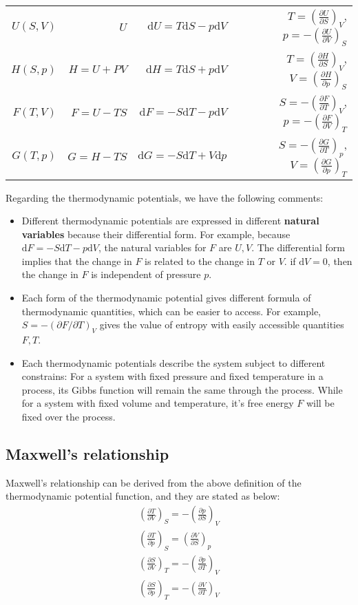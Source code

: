\documentclass{article}
\newcommand{\pfrac}[2]{\frac{\partial #1}{\partial #2}}
\newcommand{\dnor}{\text{d}}
\begin{document}
\begin{table*}[h]
    \centering
    \begin{tabular}{rrrr}
     $U(S,V)$ &   $U$          & $\dnor U =   T \dnor S - p \dnor V$ & $T = \left(\pfrac{U}{S}\right)_V$, $p = -\left(\pfrac{U}{V}\right)_S$ \\
     $H(S,p)$ &   $H = U + PV$ & $\dnor H =   T \dnor S + p \dnor V$ & $T = \left(\pfrac{H}{S}\right)_V$, $V = \left(\pfrac{H}{p}\right)_S$ \\
     $F(T,V)$ &   $F = U - TS$ & $\dnor F = - S \dnor T - p \dnor V$ & $S = -\left(\pfrac{F}{T}\right)_V$, $p = -\left(\pfrac{F}{V}\right)_T$ \\
     $G(T,p)$ &   $G = H - TS$ & $\dnor G = - S \dnor T + V \dnor p$ & $S = -\left(\pfrac{G}{T}\right)_p$, $V = \left(\pfrac{G}{p}\right)_T$ \\
     \end{tabular}
\end{table*}

Regarding the thermodynamic potentials, we have the following comments:
\begin{itemize}
    \item Different thermodynamic potentials are expressed in different \textbf{natural variables} because 
            their differential form. For example, because $\dnor F = - S \dnor T - p \dnor V$, the natural variables for $F$ are $U, V$. 
            The differential form implies that the change in $F$ is related to the change in $T$ or $V$. if $\dnor V = 0$, then the change
            in $F$ is independent of pressure $p$. 
    \item Each form of the thermodynamic potential gives different formula of thermodynamic quantities, which can be easier to access. For 
            example, $S = -\left(\partial{F}/\partial{T}\right)_V$ gives the value of entropy with easily accessible quantities $F, T$.
    \item Each thermodynamic potentials describe the system subject to different constrains: For a system with fixed pressure and fixed temperature
            in a process, its Gibbs function will remain the same through the process. While for a system with fixed volume and temperature, 
            it's free energy $F$ will be fixed over the process.
\end{itemize}

\subsection{Maxwell's relationship}
Maxwell's relationship can be derived from the above  definition of the thermodynamic
potential function, and they are stated as below:
\begin{gather}
    \left(\pfrac{T}{V}\right)_S = - \left(\pfrac{p}{S}\right)_V \\
    \left(\pfrac{T}{p}\right)_S = \left(\pfrac{V}{S}\right)_p \\
    \left(\pfrac{S}{V}\right)_T = - \left(\pfrac{p}{T}\right)_V \\
    \left(\pfrac{S}{p}\right)_T = - \left(\pfrac{V}{T}\right)_V 
\end{gather}
\end{document}
